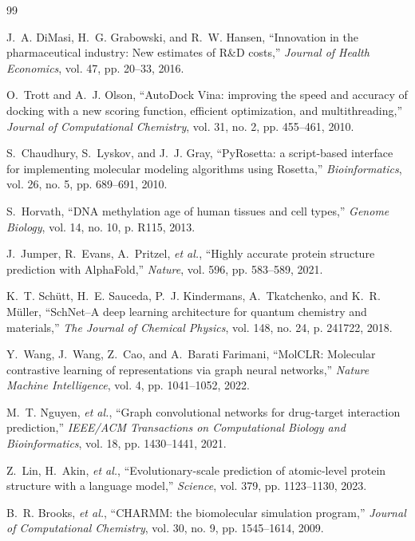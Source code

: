 \documentclass[10pt,journal,compsoc]{IEEEtran}
\begin{document}
\begin{thebibliography}{99}

J.~A. DiMasi, H.~G. Grabowski, and R.~W. Hansen, ``Innovation in the pharmaceutical industry: New estimates of R\&D costs,'' \emph{Journal of Health Economics}, vol. 47, pp. 20--33, 2016.

O.~Trott and A.~J. Olson, ``AutoDock Vina: improving the speed and accuracy of docking with a new scoring function, efficient optimization, and multithreading,'' \emph{Journal of Computational Chemistry}, vol. 31, no. 2, pp. 455--461, 2010.

S.~Chaudhury, S.~Lyskov, and J.~J. Gray, ``PyRosetta: a script-based interface for implementing molecular modeling algorithms using Rosetta,'' \emph{Bioinformatics}, vol. 26, no. 5, pp. 689--691, 2010.

S.~Horvath, ``DNA methylation age of human tissues and cell types,'' \emph{Genome Biology}, vol. 14, no. 10, p. R115, 2013.

J.~Jumper, R.~Evans, A.~Pritzel, \emph{et al.}, ``Highly accurate protein structure prediction with AlphaFold,'' \emph{Nature}, vol. 596, pp. 583--589, 2021.

K.~T. Sch\"utt, H.~E. Sauceda, P.~J. Kindermans, A.~Tkatchenko, and K.~R. M\"uller, ``SchNet--A deep learning architecture for quantum chemistry and materials,'' \emph{The Journal of Chemical Physics}, vol. 148, no. 24, p. 241722, 2018.

Y.~Wang, J.~Wang, Z.~Cao, and A.~Barati Farimani, ``MolCLR: Molecular contrastive learning of representations via graph neural networks,'' \emph{Nature Machine Intelligence}, vol. 4, pp. 1041--1052, 2022.

M.~T. Nguyen, \emph{et al.}, ``Graph convolutional networks for drug-target interaction prediction,'' \emph{IEEE/ACM Transactions on Computational Biology and Bioinformatics}, vol. 18, pp. 1430--1441, 2021.

Z.~Lin, H.~Akin, \emph{et al.}, ``Evolutionary-scale prediction of atomic-level protein structure with a language model,'' \emph{Science}, vol. 379, pp. 1123--1130, 2023.

B.~R. Brooks, \emph{et al.}, ``CHARMM: the biomolecular simulation program,'' \emph{Journal of Computational Chemistry}, vol. 30, no. 9, pp. 1545--1614, 2009.


\end{thebibliography}
\end{document}

